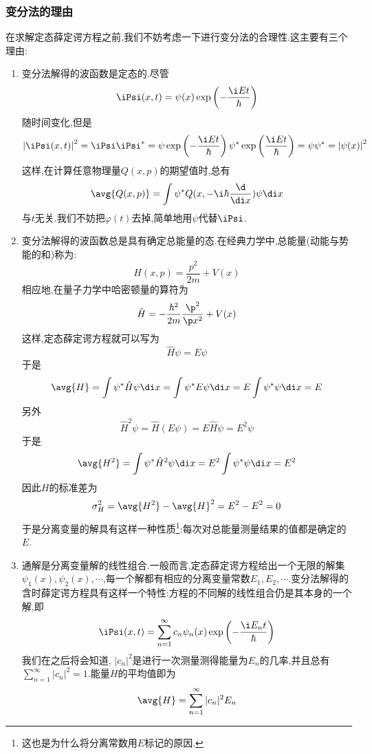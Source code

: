 \documentclass{ctexart}
\begin{document}
\subsubsection{变分法的理由}
在求解定态薛定谔方程之前,我们不妨考虑一下进行变分法的合理性.这主要有三个理由:
\begin{enumerate}[label=\tbf{\arabic*.},leftmargin=*]
    \item 变分法解得的波函数是定态的.尽管
    \[\iPsi(x,t)=\psi(x)\exp\left(-\dfrac{\i Et}{\hbar}\right)\]
    随时间变化,但是
    \[\left|\iPsi(x,t)\right|^2=\iPsi\iPsi^\ast=\psi\exp\left(-\dfrac{\i Et}{\hbar}\right)\psi^\ast\exp\left(\dfrac{\i Et}{\hbar}\right)=\psi\psi^\ast=\left|\psi(x)\right|^2\]
    这样,在计算任意物理量$Q(x,p)$的期望值时,总有
    \[\avg{Q(x,p)}=\int\psi^\ast Q(x,-\i\hbar\dfrac{\d}{\di x})\psi\di x\]
    与$t$无关.我们不妨把$\varphi(t)$去掉,简单地用$\psi$代替$\iPsi$.
    \item 变分法解得的波函数总是具有确定总能量的态.在经典力学中,总能量(动能与势能的和)称为:
    \[H(x,p)=\dfrac{p^2}{2m}+V(x)\]
    相应地,在量子力学中哈密顿量的算符为
    \[\hat{H}=-\dfrac{\hbar^2}{2m}\dfrac{\p^2}{\p x^2}+V(x)\]
    这样,定态薛定谔方程就可以写为
    \[\hat{H}\psi=E\psi\]
    于是
    \[\avg{H}=\int\psi^\ast\hat{H}\psi\di x=\int\psi^\ast E\psi\di x=E\int\psi^\ast\psi\di x=E\]
    另外
    \[\hat{H}^2\psi=\hat{H}(E\psi)=E\hat{H}\psi=E^2\psi\]
    于是
    \[\avg{H^2}=\int\psi^\ast\hat{H}^2\psi\di x=E^2\int\psi^\ast\psi\di x=E^2\]
    因此$H$的标准差为
    \[\sigma_{H}^2=\avg{H^2}-\avg{H}^2=E^2-E^2=0\]
    于是分离变量的解具有这样一种性质\footnote{这也是为什么将分离常数用$E$标记的原因.}:每次对总能量测量结果的值都是确定的$E$.
    \item 通解是分离变量解的线性组合.一般而言,定态薛定谔方程给出一个无限的解集$\psi_1(x),\psi_2(x),\cdots$,每一个解都有相应的分离变量常数$E_1,E_2,\cdots$.变分法解得的含时薛定谔方程具有这样一个特性:方程的不同解的线性组合仍是其本身的一个解,即
    \[\iPsi(x,t)=\sum_{n=1}^{\infty}c_n\psi_n(x)\exp\left(-\dfrac{\i E_nt}{\hbar}\right)\]
    我们在之后将会知道, $|c_n|^2$是进行一次测量测得能量为$E_n$的几率,并且总有$\displaystyle\sum_{n=1}^{\infty}|c_n|^2=1$.能量$H$的平均值即为
    \[\avg{H}=\sum_{n=1}^{\infty}|c_n|^2E_n\]
\end{enumerate}
\end{document}
